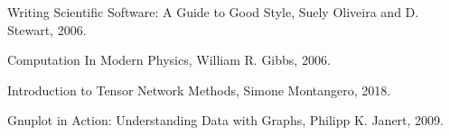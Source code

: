 
\cleardoublepage
{}
\begin{thebibliography}{99}

%
%

 Writing Scientific Software: A Guide to Good Style,
 Suely Oliveira and D. Stewart, 2006.
 

 Computation In Modern Physics,
William R. Gibbs, 2006.
 
Introduction to Tensor Network Methods,
Simone Montangero, 2018.
 
Gnuplot in Action: Understanding Data with Graphs,
Philipp K. Janert, 2009.

\end{thebibliography}
